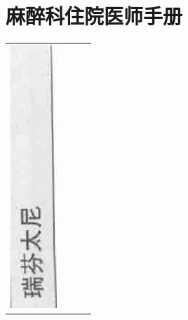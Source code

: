 \documentclass[10pt]{article}
\begin{document}
\section*{麻醉科住院医师手册}
\begin{center}
\begin{tabular}{|c|c|c|c|}
\hline
\includegraphics[max width=\textwidth]{2024_07_05_645bb794a4d4f32ee0c8g-332(5)}

\end{tabular}
\end{center}
\end{document}
